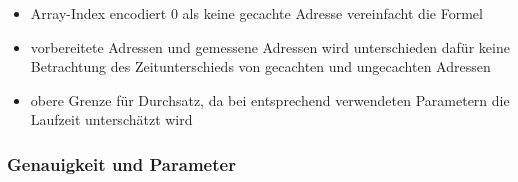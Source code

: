 \begin{frame}
{        \begin{itemize}
            \item Array-Index encodiert $0$ als keine gecachte Adresse \textrightarrow\space vereinfacht die Formel
            \item vorbereitete Adressen und gemessene Adressen wird unterschieden \textrightarrow\space
            dafür keine Betrachtung des Zeitunterschieds von gecachten und ungecachten Adressen
            \item obere Grenze für Durchsatz, da bei entsprechend verwendeten Parametern die Laufzeit unterschätzt wird
        \end{itemize}
    }

\end{frame}

\begin{frame}
    \frametitle{Genauigkeit und Parameter}


\end{frame}
